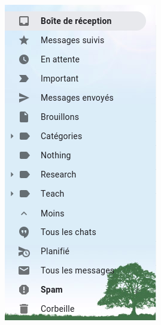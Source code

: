\documentclass[xcolor=table]{beamer}
\begin{document}
\begin{frame}
\begin{minipage}{0.26\textwidth}
	\includegraphics[width=\textwidth]{..//img/Bweb02-ri-gmail/gmail-folders.png}
\end{minipage}

\end{frame}
\end{document}
